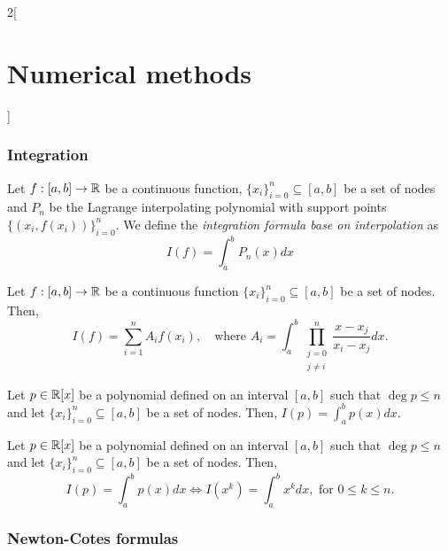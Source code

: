 \documentclass[../../../main.tex]{subfiles}
\begin{document}
\begin{multicols}{2}[\section{Numerical methods}]
\subsubsection*{Integration}
\begin{definition}
    Let $f:[a,b]\rightarrow\mathbb{R}$ be a continuous function, $\{x_i\}_{i=0}^n\subseteq[a,b]$ be a set of nodes and $P_n$ be the Lagrange interpolating polynomial with support points $\{(x_i,f(x_i))\}_{i=0}^n$. We define the \textit{integration formula base on interpolation} as 
    \begin{equation}
        I(f)=\int_a^bP_n(x)dx
        \label{NM-integration}
    \end{equation}
\end{definition}
\begin{lemma}
    Let $f:[a,b]\rightarrow\mathbb{R}$ be a continuous function $\{x_i\}_{i=0}^n\subseteq[a,b]$ be a set of nodes. Then, $$I(f)=\sum_{i=1}^nA_if(x_i),\quad\text{where }A_i=\int_a^b\prod_{\substack{j=0\\j\ne i}}^n\frac{x-x_j}{x_i-x_j}dx.$$
\end{lemma}
\begin{lemma}
    Let $p\in\mathbb{R}[x]$ be a polynomial defined on an interval $[a,b]$ such that $\deg p\leq n$ and let $\{x_i\}_{i=0}^n\subseteq[a,b]$ be a set of nodes. Then, $I(p)=\int_a^bp(x)dx$.
\end{lemma}
\begin{lemma}
    Let $p\in\mathbb{R}[x]$ be a polynomial defined on an interval $[a,b]$ such that $\deg p\leq n$ and let $\{x_i\}_{i=0}^n\subseteq[a,b]$ be a set of nodes. Then, $$I(p)=\int_a^bp(x)dx\iff I(x^k)=\int_a^bx^kdx,\text{ for }0\leq k\leq n.$$
\end{lemma}
\subsubsection*{Newton-Cotes formulas}
\end{multicols}
\end{document}
